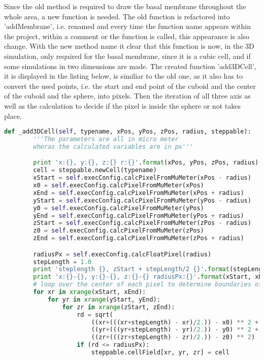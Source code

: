Since the old method is required to draw the basal membrane throughout the whole area, a new function is needed. The old function is refactored into 'addMembrane', i.e. renamed and every time the function name appears within the project, within a comment or the function is called, this appearance is also change. With the new method name it clear that this function is now, in the 3D simulation, only required for the basal membrane, since it is a cubic cell, and if some simulations in two dimensions are made.\newline
The created function 'add3DCell', it is displayed in the listing below, is similiar to the old one, as it also has to convert the used points, i.e. the start and end point of the cuboid and the center of the cuboid and the sphere, into pixels. Then the iteration of all three axis as well as the calculation to decide if the pixel is inside the sphere or not takes place.

\begin{lstlisting}[language=Python, caption = created method to draw a spere cell]
    def _add3DCell(self, typename, xPos, yPos, zPos, radius, steppable):
        '''The parameters are all in micro meter
        wheras the calculated variables are in px'''

        print 'x:{}, y:{}, z:{} r:{}'.format(xPos, yPos, zPos, radius)
        cell = steppable.newCell(typename)
        xStart = self.execConfig.calcPixelFromMuMeter(xPos - radius)
        x0 = self.execConfig.calcPixelFromMuMeter(xPos)
        xEnd = self.execConfig.calcPixelFromMuMeter(xPos + radius)
        yStart = self.execConfig.calcPixelFromMuMeter(yPos - radius)
        y0 = self.execConfig.calcPixelFromMuMeter(yPos)
        yEnd = self.execConfig.calcPixelFromMuMeter(yPos + radius)
        zStart = self.execConfig.calcPixelFromMuMeter(zPos - radius)
        z0 = self.execConfig.calcPixelFromMuMeter(zPos)
        zEnd = self.execConfig.calcPixelFromMuMeter(zPos + radius)

        radiusPx = self.execConfig.calcFloatPixel(radius)
        stepLength = 1.0
        print 'steplength {}, zStart + stepLength/2 {}'.format(stepLength, (zStart+(((zStart+stepLength) - zStart)/2.)))
        print 'x:{}-{}, y:{}-{}, z:{}-{} radiusPx:{}'.format(xStart, xEnd, yStart, yEnd, zStart, zEnd, radiusPx)
        # loop over the center of each pixel to determine boundaries of the circle
        for xr in xrange(xStart, xEnd):
            for yr in xrange(yStart, yEnd):
                for zr in xrange(zStart, zEnd):
                    rd = sqrt(
                        ((xr+(((xr+stepLength) - xr)/2.)) - x0) ** 2 +
                        ((yr+(((yr+stepLength) - yr)/2.)) - y0) ** 2 +
                        ((zr+(((zr+stepLength) - zr)/2.)) - z0) ** 2)
                    if (rd <= radiusPx):
                        steppable.cellField[xr, yr, zr] = cell
\end{lstlisting}

